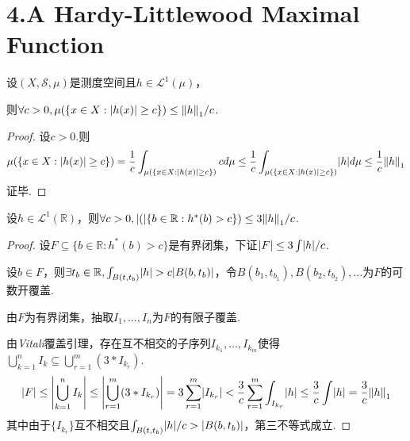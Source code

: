 \section{4.A Hardy-Littlewood Maximal Function}

\begin{theorem}[4.1]\label{4.1}
    设\((X, \mathcal{S}, \mu)\)是测度空间且\(h \in \mathcal{L}^1(\mu)\)，
    
    则\(\forall c>0, \mu(\{x \in X: \abs*{h(x)} \geq c\}) \leq \norm*{h}_1/c\).
\end{theorem}

\begin{proof}
    设\(c>0\).则
    \begin{align*}
        \mu(\{x \in X: \abs*{h(x)} \geq c\})=\frac{1}{c}\int_{\mu(\{x \in X: \abs*{h(x)} \geq c\})} c d\mu
        \leq \frac{1}{c}\int_{\mu(\{x \in X: \abs*{h(x)} \geq c\})} \abs*{h} d\mu
        \leq \frac{1}{c} \norm*{h}_1
    \end{align*}
    证毕.
\end{proof}

\begin{theorem}[4.8]\label{4.8}
    设\(h \in \mathcal{L}^1(\mathbb{R})\)，则\(\forall c>0, \abs*(\{b \in \mathbb{R}: h^*(b)>c\}) \leq 3\norm*{h}_1/c\).
\end{theorem}

\begin{proof}
    设\(F \subseteq \{b \in \mathbb{R}: h^*(b)>c\}\)是有界闭集，下证\(\abs*{F} \leq 3\int \abs*{h}/c\).

    设\(b \in F\)，则\(\exists t_b \in \mathbb{R}, \int_{B(t,t_b)}\abs*{h}>c\abs*{B(b,t_b)}\)，令\(B(b_1,t_{b_1}), B(b_2,t_{b_2}), \dots\)为\(F\)的可数开覆盖.

    由\(F\)为有界闭集，抽取\(I_1, \dots, I_n\)为\(F\)的有限子覆盖.

    由\textit{Vitali}覆盖引理，存在互不相交的子序列\(I_{k_1}, \dots, I_{k_m}\)使得\(\bigcup_{k=1}^n I_k \subseteq \bigcup_{r=1}^m (3*I_{k_r})\).
    \begin{align*}
        \abs*{F} \leq \abs*{\bigcup_{k=1}^n I_k} \leq \abs*{\bigcup_{r=1}^m (3*I_{k_r})}=3\sum_{r=1}^m \abs*{I_{k_r}}
        <\frac{3}{c} \sum_{r=1}^m \int_{I_{k_r}} \abs*{h} \leq \frac{3}{c} \int \abs*{h}=\frac{3}{c} \norm*{h}_1
    \end{align*}
    其中由于\(\{I_{k_r}\}\)互不相交且\(\int_{B(t,t_b)}\abs*{h}/c>\abs*{B(b,t_b)}\)，第三不等式成立.
\end{proof}